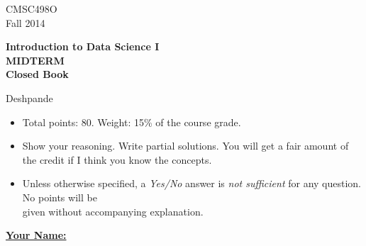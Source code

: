 \documentclass[11pt]{article}
\begin{document}
{
\begin{center}
\large
\vspace{5pt}
\parbox{1.5in}{CMSC498O\\ Fall 2014} \parbox{3in}{\begin{center}\bf Introduction to Data Science I \\ MIDTERM \\ Closed Book\end{center}}
\parbox{1.5in}{Deshpande}
\end{center}
}

\begin{itemize}
\item Total points: 80. Weight: 15\% of the course grade. 
\item Show your reasoning. Write partial solutions. You will get a fair amount of the credit if I think you
know the concepts.

\item Unless otherwise specified, a {\em Yes/No} answer is {\em not sufficient} for any question. No points will be \\ given without
accompanying explanation.
\end{itemize}

\underline{\bf \large Your Name:} 



\newcommand{\qonetopic}{Misc Questions}
\newcommand{\qtwotopic}{Modelling}
\newcommand{\qthreetopic}{Functional Dependencies/Normalization}
\newcommand{\qfourtopic}{Relational Algebra/SQL}
\newcommand{\qfivetopic}{Buffer Management}

\newcommand{\er}{\textbf{(E/R Modeling)}}
\newcommand{\normalization}{\textbf{(Normalization)}}
\newcommand{\raid}{\textbf{(RAID)}}


\end{document}
